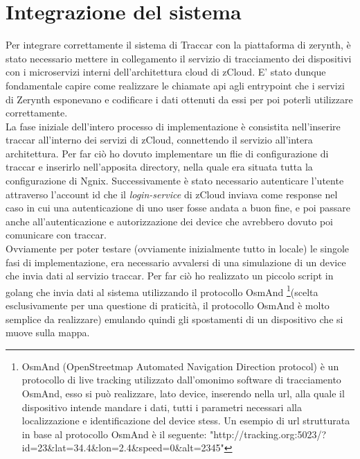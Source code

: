 \documentclass[a4paper,titlepage,12pt]{book}
\begin{document}
\chapter{
\sffamily Integrazione del sistema}
Per integrare correttamente il sistema di Traccar con la piattaforma di zerynth, è stato necessario mettere in collegamento il servizio di tracciamento dei dispositivi con i microservizi interni dell'architettura cloud di zCloud. E' stato dunque fondamentale capire come realizzare le chiamate api agli entrypoint che i servizi di Zerynth esponevano e codificare i dati ottenuti da essi per poi poterli utilizzare correttamente. \\
La fase iniziale dell'intero processo di implementazione è consistita nell'inserire traccar all'interno dei servizi di zCloud, connettendo il servizio all'intera architettura. Per far ciò ho dovuto implementare un flie di configurazione di traccar e inserirlo nell'apposita directory, nella quale era situata tutta la configurazione di Ngnix. Successivamente è stato necessario autenticare l'utente attraverso l'account id che il \textit{login-service} di zCloud inviava come response nel caso in cui una autenticazione di uno user fosse andata a buon fine, e poi passare anche all'autenticazione e autorizzazione dei device che avrebbero dovuto poi comunicare con traccar. \\
Ovviamente per poter testare (ovviamente inizialmente tutto in locale) le singole fasi di implementazione, era necessario avvalersi di una simulazione di un device che invia dati al servizio traccar. Per far ciò ho realizzato un piccolo script in golang che invia dati al sistema utilizzando il protocollo OsmAnd \footnote{\sffamily OsmAnd (OpenStreetmap Automated Navigation Direction protocol) è un protocollo di live tracking utilizzato dall'omonimo software di tracciamento OsmAnd, esso si può realizzare, lato device, inserendo nella url, alla quale il dispositivo intende mandare i dati, tutti i parametri necessari alla localizzazione e identificazione del device stess. Un esempio di url strutturata in base al protocollo OsmAnd è il seguente: "http://tracking.org:5023/?id=23\&lat=34.4\&lon=2.4\&speed=0\&alt=2345"}(scelta esclusivamente per una questione di praticità, il protocollo OsmAnd è molto semplice da realizzare) emulando quindi gli spostamenti di un dispositivo che si muove sulla mappa.
\end{document}

